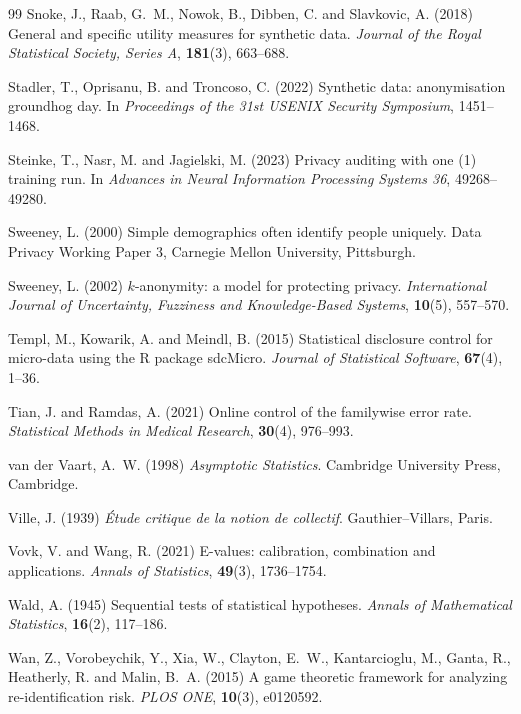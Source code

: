 \documentclass[11pt,a4paper]{article}
\theoremstyle{plain}
\theoremstyle{definition}
\begin{document}
\begin{thebibliography}{99}
Snoke, J., Raab, G.~M., Nowok, B., Dibben, C. and Slavkovic, A. (2018) General
and specific utility measures for synthetic data. \emph{Journal of the Royal
Statistical Society, Series A}, \textbf{181}(3), 663--688.

Stadler, T., Oprisanu, B. and Troncoso, C. (2022) Synthetic data: anonymisation
groundhog day. In \emph{Proceedings of the 31st USENIX Security Symposium},
1451--1468.

Steinke, T., Nasr, M. and Jagielski, M. (2023) Privacy auditing with one (1)
training run. In \emph{Advances in Neural Information Processing Systems 36},
49268--49280.

Sweeney, L. (2000) Simple demographics often identify people uniquely. Data
Privacy Working Paper 3, Carnegie Mellon University, Pittsburgh.

Sweeney, L. (2002) $k$-anonymity: a model for protecting privacy.
\emph{International Journal of Uncertainty, Fuzziness and Knowledge-Based
Systems}, \textbf{10}(5), 557--570.

Templ, M., Kowarik, A. and Meindl, B. (2015) Statistical disclosure control for
micro-data using the R package sdcMicro. \emph{Journal of Statistical
Software}, \textbf{67}(4), 1--36.

Tian, J. and Ramdas, A. (2021) Online control of the familywise error rate.
\emph{Statistical Methods in Medical Research}, \textbf{30}(4), 976--993.

van der Vaart, A.~W. (1998) \emph{Asymptotic Statistics}. Cambridge University
Press, Cambridge.

Ville, J. (1939) \emph{\'Etude critique de la notion de collectif}. Gauthier--Villars,
Paris.

Vovk, V. and Wang, R. (2021) E-values: calibration, combination and
applications. \emph{Annals of Statistics}, \textbf{49}(3), 1736--1754.

Wald, A. (1945) Sequential tests of statistical hypotheses. \emph{Annals of
Mathematical Statistics}, \textbf{16}(2), 117--186.

Wan, Z., Vorobeychik, Y., Xia, W., Clayton, E.~W., Kantarcioglu, M., Ganta, R.,
Heatherly, R. and Malin, B.~A. (2015) A game theoretic framework for analyzing
re-identification risk. \emph{PLOS ONE}, \textbf{10}(3), e0120592.


\end{thebibliography}
\end{document}
